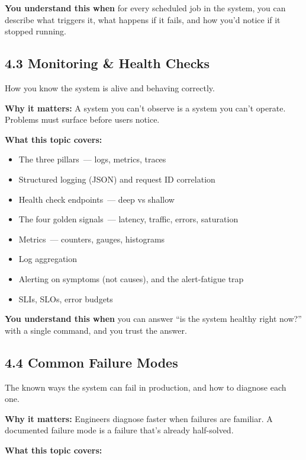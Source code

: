 \noindent{}\textbf{You understand this when} for every scheduled job in the system, you can describe what triggers it, what happens if it fails, and how you'd notice if it stopped running.

\subsection*{4.3 Monitoring \& Health Checks}\label{project-planning-guide:43-monitoring--health-checks}

How you know the system is alive and behaving correctly.

\textbf{Why it matters:} A system you can't observe is a system you can't operate. Problems must surface before users notice.

\textbf{What this topic covers:}

\begin{itemize}
\tightlist
\item
  The three pillars~--- logs, metrics, traces
\item
  Structured logging (JSON) and request ID correlation
\item
  Health check endpoints~--- deep vs shallow
\item
  The four golden signals~--- latency, traffic, errors, saturation
\item
  Metrics~--- counters, gauges, histograms
\item
  Log aggregation
\item
  Alerting on symptoms (not causes), and the alert-fatigue trap
\item
  SLIs, SLOs, error budgets
\end{itemize}

\noindent{}\textbf{You understand this when} you can answer ``is the system healthy right now?'' with a single command, and you trust the answer.

\subsection*{4.4 Common Failure Modes}\label{project-planning-guide:44-common-failure-modes}

The known ways the system can fail in production, and how to diagnose each one.

\textbf{Why it matters:} Engineers diagnose faster when failures are familiar. A documented failure mode is a failure that's already half-solved.

\textbf{What this topic covers:}

